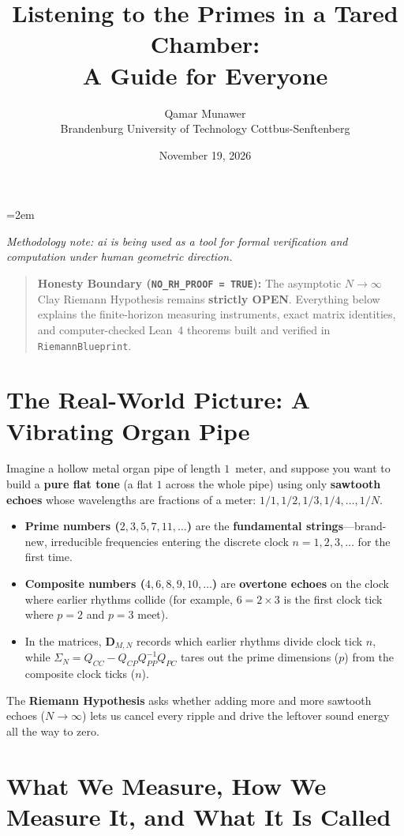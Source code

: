 \documentclass[11pt,a4paper]{article}
\title{\textbf{Listening to the Primes in a Tared Chamber:\\A Guide for Everyone}}
\author{Qamar Munawer \\ Brandenburg University of Technology Cottbus-Senftenberg}
\date{November 19, 2026}
\begin{document}
\emergencystretch=2em
\maketitle
\vspace{0.5em}\noindent\textit{Methodology note: ai is being used as a tool for formal verification and computation under human geometric direction.}

\begin{quote}
\textbf{Honesty Boundary (\texttt{NO\_RH\_PROOF = TRUE}):} The asymptotic $N \to \infty$ Clay Riemann Hypothesis remains \textbf{strictly OPEN}. Everything below explains the finite-horizon measuring instruments, exact matrix identities, and computer-checked Lean~4 theorems built and verified in \texttt{RiemannBlueprint}.
\end{quote}

\section{The Real-World Picture: A Vibrating Organ Pipe}

Imagine a hollow metal organ pipe of length $1$~meter, and suppose you want to build a \textbf{pure flat tone} (a flat $1$ across the whole pipe) using only \textbf{sawtooth echoes} whose wavelengths are fractions of a meter: $1/1, 1/2, 1/3, 1/4, \dots, 1/N$.
\begin{itemize}[leftmargin=1.6em]
  \item \textbf{Prime numbers ($2, 3, 5, 7, 11, \dots$)} are the \textbf{fundamental strings}---brand-new, irreducible frequencies entering the discrete clock $n = 1, 2, 3, \dots$ for the first time.
  \item \textbf{Composite numbers ($4, 6, 8, 9, 10, \dots$)} are \textbf{overtone echoes} on the clock where earlier rhythms collide (for example, $6 = 2 \times 3$ is the first clock tick where $p=2$ and $p=3$ meet).
  \item In the matrices, $\mathbf{D}_{M,N}$ records which earlier rhythms divide clock tick $n$, while $\Sigma_N = Q_{CC} - Q_{CP}Q_{PP}^{-1}Q_{PC}$ tares out the prime dimensions ($p$) from the composite clock ticks ($n$).
\end{itemize}
The \textbf{Riemann Hypothesis} asks whether adding more and more sawtooth echoes ($N \to \infty$) lets us cancel every ripple and drive the leftover sound energy all the way to zero.

\section{What We Measure, How We Measure It, and What It Is Called}
\end{document}
